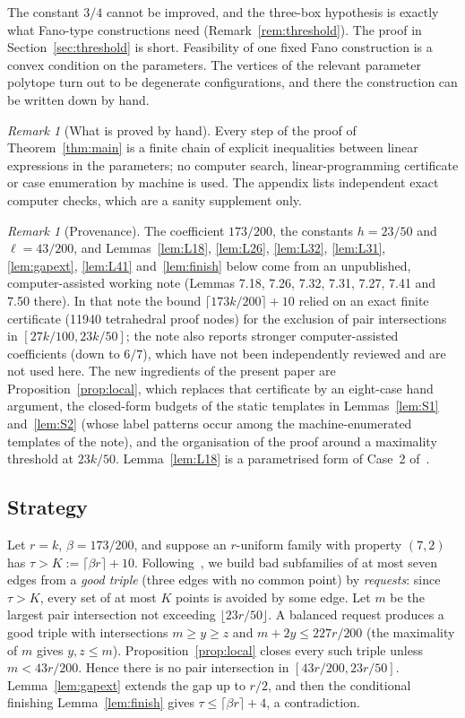 \documentclass[11pt]{amsart}
\theoremstyle{definition}
\theoremstyle{remark}
\newtheorem{remark}[theorem]{Remark}
\newcommand{\ceil}[1]{\lceil #1\rceil}
\newcommand{\floor}[1]{\lfloor #1\rfloor}
\begin{document}
The constant $3/4$ cannot be improved, and the three-box hypothesis is exactly what Fano-type constructions need (Remark~\ref{rem:threshold}). The proof in Section~\ref{sec:threshold} is short. Feasibility of one fixed Fano construction is a convex condition on the parameters. The vertices of the relevant parameter polytope turn out to be degenerate configurations, and there the construction can be written down by hand.

\begin{remark}[What is proved by hand]
Every step of the proof of Theorem~\ref{thm:main} is a finite chain of explicit inequalities between linear expressions in the parameters; no computer search, linear-programming certificate or case enumeration by machine is used. The appendix lists independent exact computer checks, which are a sanity supplement only.
\end{remark}

\begin{remark}[Provenance]\label{rem:prov}
The coefficient $173/200$, the constants $h=23/50$ and $\ell=43/200$, and Lemmas~\ref{lem:L18}, \ref{lem:L26}, \ref{lem:L32}, \ref{lem:L31}, \ref{lem:gapext}, \ref{lem:L41} and~\ref{lem:finish} below come from an unpublished, computer-assisted working note (Lemmas 7.18, 7.26, 7.32, 7.31, 7.27, 7.41 and 7.50 there). In that note the bound $\ceil{173k/200}+10$ relied on an exact finite certificate (11940 tetrahedral proof nodes) for the exclusion of pair intersections in $[27k/100,23k/50]$; the note also reports stronger computer-assisted coefficients (down to $6/7$), which have not been independently reviewed and are not used here. The new ingredients of the present paper are Proposition~\ref{prop:local}, which replaces that certificate by an eight-case hand argument, the closed-form budgets of the static templates in Lemmas~\ref{lem:S1} and~\ref{lem:S2} (whose label patterns occur among the machine-enumerated templates of the note), and the organisation of the proof around a maximality threshold at $23k/50$. Lemma~\ref{lem:L18} is a parametrised form of Case~2 of~\cite[Lemma~1]{FKW}.
\end{remark}

\subsection*{Strategy}
Let $r=k$, $\beta=173/200$, and suppose an $r$-uniform family with property $(7,2)$ has $\tau>K:=\ceil{\beta r}+10$. Following~\cite{FKW}, we build bad subfamilies of at most seven edges from a \emph{good triple} (three edges with no common point) by \emph{requests}: since $\tau>K$, every set of at most $K$ points is avoided by some edge. Let $m$ be the largest pair intersection not exceeding $\floor{23r/50}$. A balanced request produces a good triple with intersections $m\ge y\ge z$ and $m+2y\le227r/200$ (the maximality of $m$ gives $y,z\le m$). Proposition~\ref{prop:local} closes every such triple unless $m<43r/200$. Hence there is no pair intersection in $[43r/200,23r/50]$. Lemma~\ref{lem:gapext} extends the gap up to $r/2$, and then the conditional finishing Lemma~\ref{lem:finish} gives $\tau\le\ceil{\beta r}+4$, a contradiction.
\end{document}
